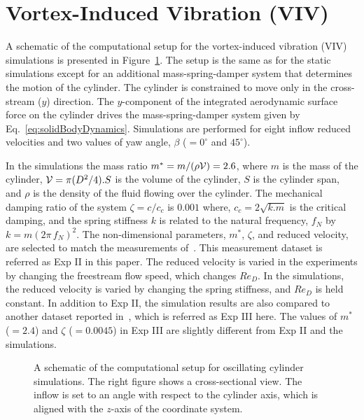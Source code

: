 \section{Vortex-Induced Vibration (VIV)}
\label{sec:VIV}
%
A schematic of the computational setup for the vortex-induced vibration (VIV)
simulations is presented in Figure~\ref{fig:VIVmodel}. The setup is the same as
for the static simulations except for an additional mass-spring-damper system
that determines the motion of the cylinder. The cylinder is constrained to
move only in the cross-stream ($y$) direction. The $y$-component of the
integrated aerodynamic surface force on the cylinder drives the
mass-spring-damper system given by Eq.~\ref{eq:solidBodyDynamics}. Simulations
are performed for eight inflow reduced velocities and two values of yaw angle,
$\beta$ ($=0^\circ$ and $45^\circ$).
 
In the simulations the mass ratio $m^*=m/(\rho {\cal V})=2.6$, where $m$ is the
mass of the cylinder, ${\cal V}=\pi (D^2/4) . S$ is the volume of the cylinder,
$S$ is the cylinder span, and $\rho$ is the density of the fluid flowing over
the cylinder. The mechanical damping ratio of the system $\zeta = c/c_c$ is
$0.001$ where, $c_c=2\sqrt{k.m}$ is the critical damping, and the spring
stiffness $k$ is related to the natural frequency, $f_N$ by $k=m(2\pi\,f_N)^2$.
The non-dimensional parameters, $m^*$, $\zeta$, and reduced velocity, are
selected to match the measurements of~\citet{franzini2013one}. This measurement
dataset is referred as Exp II in this paper. The reduced velocity is varied in
the experiments by changing the freestream flow speed, which changes $Re_D$.
In the simulations, the reduced velocity is varied by changing the spring
stiffness, and $Re_D$ is held constant. In addition to Exp II, the simulation
results are also compared to another dataset reported
in~\cite{khalak1997fluid}, which is referred as Exp III here. The values of
$m^*$ ($=2.4$) and $\zeta$ ($=0.0045$) in Exp III are slightly different from
Exp II and the simulations. 
%
\begin{figure}[htb!]
  \caption{A schematic of the computational setup for oscillating cylinder
    simulations. The right figure shows a cross-sectional view. The inflow is set
    to an angle with respect to the cylinder axis, which is aligned with the
    $z$-axis of the coordinate system.}
  \label{fig:VIVmodel}
\end{figure}

